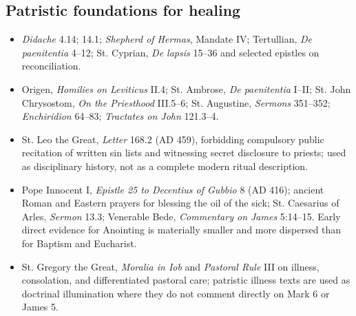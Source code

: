 \subsection*{Patristic foundations for healing}
{\footnotesize
\begin{itemize}[itemsep=0.18em,topsep=0.25em]
\item \emph{Didache} 4.14; 14.1; \emph{Shepherd of Hermas}, Mandate IV; Tertullian, \emph{De paenitentia} 4--12; St. Cyprian, \emph{De lapsis} 15--36 and selected epistles on reconciliation.
\item Origen, \emph{Homilies on Leviticus} II.4; St. Ambrose, \emph{De paenitentia} I--II; St. John Chrysostom, \emph{On the Priesthood} III.5--6; St. Augustine, \emph{Sermons} 351--352; \emph{Enchiridion} 64--83; \emph{Tractates on John} 121.3--4.
\item St. Leo the Great, \emph{Letter} 168.2 (AD 459), forbidding compulsory public recitation of written sin lists and witnessing secret disclosure to priests; used as disciplinary history, not as a complete modern ritual description.
\item Pope Innocent I, \emph{Epistle 25 to Decentius of Gubbio} 8 (AD 416); ancient Roman and Eastern prayers for blessing the oil of the sick; St. Caesarius of Arles, \emph{Sermon} 13.3; Venerable Bede, \emph{Commentary on James} 5:14--15. Early direct evidence for Anointing is materially smaller and more dispersed than for Baptism and Eucharist.
\item St. Gregory the Great, \emph{Moralia in Iob} and \emph{Pastoral Rule} III on illness, consolation, and differentiated pastoral care; patristic illness texts are used as doctrinal illumination where they do not comment directly on Mark 6 or James 5.
\end{itemize}
}

